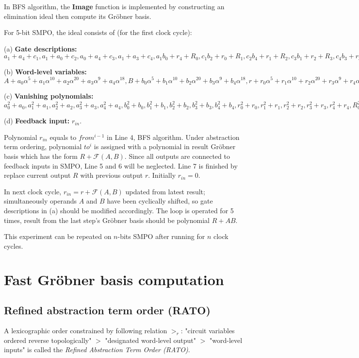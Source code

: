 \documentclass{acm_proc_article-sp}
\begin{document}
In BFS algorithm, the \textbf{Image} function is implemented by constructing an elimination ideal then 
compute its Gr\"obner basis. 
\begin{Example}
\label{ex:SMPO}
For 5-bit SMPO, the ideal consists of (for the first clock cycle):

(a) {\bf Gate descriptions:}
$a_1+a_4+c_1, a_1+a_0+c_2, a_0+a_4+c_3, a_1+a_3+c_4,
		  a_1b_0+r_4+R_0, c_1b_2+r_0+R_1, c_2b_4+r_1+R_2, c_3b_1+r_2+R_3, c_4b_3+r_3+R_4;$
		  
(b) {\bf Word-level variables:}
$A+a_0\alpha^5+a_1\alpha^{10}+a_2\alpha^{20}+a_3\alpha^9+a_4\alpha^{18},
		  B+b_0\alpha^5+b_1\alpha^{10}+b_2\alpha^{20}+b_3\alpha^9+b_4\alpha^{18},
		  r+r_0\alpha^5+r_1\alpha^{10}+r_2\alpha^{20}+r_3\alpha^9+r_4\alpha^{18},
		  R+R_0\alpha^5+R_1\alpha^{10}+R_2\alpha^{20}+R_3\alpha^9+R_4\alpha^{18};$
		  
(c) {\bf Vanishing polynomials:}
		 $ a_0^2+a_0, a_1^2+a_1, a_2^2+a_2, a_3^2+a_3, a_4^2+a_4,
		  b_0^2+b_0, b_1^2+b_1, b_2^2+b_2, b_3^2+b_3, b_4^2+b_4,
		  r_0^2+r_0, r_1^2+r_1, r_2^2+r_2, r_3^2+r_3, r_4^2+r_4,
		  R_0^2+R_0, R_1^2+R_1, R_2^2+R_2, R_3^2+R_3, R_4^2+R_4,
		  c_1^2+c_1, c_2^2+c_2, c_3^2+c_3, c_4^2+c_4,
		  A^{32}+A, B^{32}+B, r^{32}+r, R^{32}+R;$
		  
(d)	{\bf Feedback input:}	  $r_{in}$.

Polynomial $r_{in}$ equals to $from^{i-1}$ in Line 4, BFS algorithm. Under abstraction term ordering,
polynomial $to^i$ is assigned with a polynomial in result Gr\"obner basis which has the form $R + \mathcal{F}(A,B)$. 
Since all outputs are connected to feedback inputs
in SMPO, Line 5 and 6 will be neglected. Line 7 is finished by replace current output $R$ with previous 
output $r$. Initially $r_{in} = 0$.

In next clock cycle, $r_{in} = r + \mathcal{F}(A,B)$ updated from latest result; simultaneously operands
$A$ and $B$ have been cyclically shifted, so gate descriptions in (a) should be modified accordingly. The 
loop is operated for 5 times, result from the last step's Gr\"obner basis should be polynomial $R + AB$.
\end{Example}

This experiment can be repeated on $n$-bits SMPO after running for $n$ clock cycles.

\section{Fast Gr\"obner basis computation}
\subsection{Refined abstraction term order (RATO)}
A lexicographic order constrained by following relation $>_{r}$: "circuit variables ordered reverse topologically" $>$ 
"designated word-level output" $>$ "word-level inputs" is called the \emph{Refined Abstraction Term Order (RATO)}.
\end{document}
